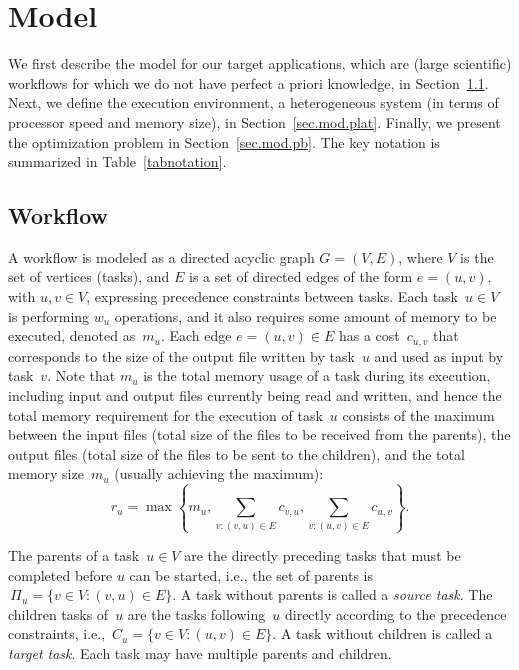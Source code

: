 \documentclass[conference]{IEEEtran}
\newcommand{\parents}[1]{\,\Pi_{#1}}
\newcommand{\children}[1]{\,C_{#1}}
\newcommand{\skug}[1]{{\color{blue}[SK: #1]}}
\begin{document}
\section{Model} %
\label{sec:model}

    We first describe the model for our target applications, which are (large scientific) workflows for which we do not have perfect a priori knowledge,
    in Section~\ref{sec.mod.work}.  Next, we define the execution
    environment, a heterogeneous system (in terms of processor speed and memory size),
    in Section~\ref{sec.mod.plat}. Finally, we present the optimization problem in
    Section~\ref{sec.mod.pb}. The key notation is summarized in Table~\ref{tabnotation}.

    \subsection{Workflow}
    \label{sec.mod.work}
    A workflow is modeled as a directed acyclic graph $G=(V, E)$, where $V$ is the set of vertices (tasks), and
    $E$ is a set of directed edges of the form $e=(u,v)$, with $u,v\in V$, expressing precedence constraints between tasks.
    Each task~$u \in V$  is performing $w_u$ operations, and it also
    requires some amount of memory to be executed, denoted as~$m_u$.
    Each edge $e=(u,v) \in E$ has a cost~$c_{u,v}$ that corresponds to the size of the output file written by task~$u$ and used as input by task~$v$.
   Note that $m_u$ is the total memory usage
    of a task during its execution, including input and output files currently being read and written,
    and hence the total memory requirement  for the execution of task~$u$ consists of the maximum
    between the input files
    (total size of the files to be received from the parents),
    the output files (total size of the files to be sent to the children),
    and the total memory size~$m_u$ (usually achieving the maximum):
    \[
        r_u = \max\left\{m_u , \sum_{v:(v,u)\in E}c_{v,u}, \sum_{v:(u,v)\in E} c_{u,v}\right\}.
    \]

    The parents of a task~$u\in V$ are the directly preceding tasks that must be completed before $u$ can be started, i.e., the set of parents is
    $ \parents{u} = \{v \in V: (v,u) \in E\}$. A task without parents is called a {\it source task}.
    The children tasks of~$u$ are the tasks following~$u$ directly according to the precedence constraints, i.e.,
    $ \children{u} = \{v \in V: (u,v) \in E\}$. A task without children is called a {\it target task}.
    Each task may have multiple parents and children.
\end{document}
